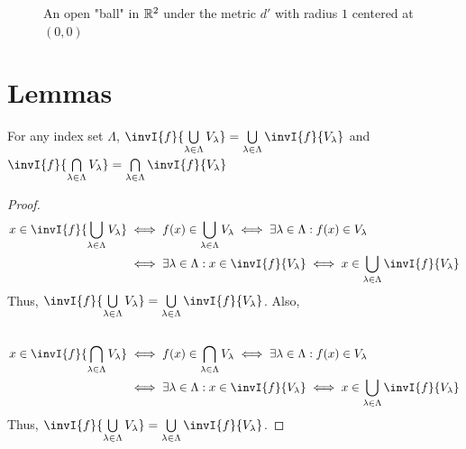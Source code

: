 \documentclass[12pt]{extarticle}
\begin{document}
\begin{figure}
\vspace*{-5mm}
\caption{An open "ball" in $\mathbb{R}^2$ under the metric $d'$ with radius $1$ centered at $(0, 0)$}

\label{fig:fourierfluc}
\end{figure}

\section*{Lemmas}

\begin{lemma} \label{invunion}
For any index set $\Lambda$, $\invI{f}{\bigcup\limits_{\lambda \in \Lambda} V_\lambda} = \bigcup\limits_{\lambda \in \Lambda} \invI{f}{V_\lambda}$ and $\invI{f}{\bigcap\limits_{\lambda \in \Lambda} V_\lambda} = \bigcap\limits_{\lambda \in \Lambda} \invI{f}{V_\lambda}$
\end{lemma}
\begin{proof}
\begin{align*}
x \in \invI{f}{\bigcup\limits_{\lambda \in \Lambda} V_\lambda} & \iff f(x) \in \bigcup\limits_{\lambda \in \Lambda} V_\lambda \iff \exists \lambda \in \Lambda : f(x) \in V_\lambda\\ & \iff \exists \lambda \in \Lambda : x \in \invI{f}{V_\lambda} \iff x \in \bigcup\limits_{\lambda \in \Lambda} \invI{f}{V_\lambda}
\end{align*}
Thus, $\invI{f}{\bigcup\limits_{\lambda \in \Lambda} V_\lambda} = \bigcup\limits_{\lambda \in \Lambda} \invI{f}{V_\lambda}$. Also, \\\\
\begin{align*}
x \in \invI{f}{\bigcap\limits_{\lambda \in \Lambda} V_\lambda} & \iff f(x) \in \bigcap\limits_{\lambda \in \Lambda} V_\lambda \iff \exists \lambda \in \Lambda : f(x) \in V_\lambda\\ & \iff \exists \lambda \in \Lambda : x \in \invI{f}{V_\lambda} \iff x \in \bigcup\limits_{\lambda \in \Lambda} \invI{f}{V_\lambda}
\end{align*}
Thus, $\invI{f}{\bigcup\limits_{\lambda \in \Lambda} V_\lambda} = \bigcup\limits_{\lambda \in \Lambda} \invI{f}{V_\lambda}$.
\end{proof}
\end{document}
